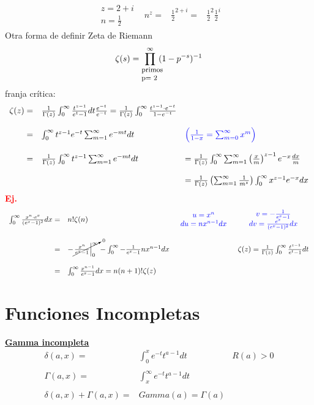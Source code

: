 \documentclass{article}
\theoremstyle{definition}
\begin{document}
\[
\begin{array}{lccc}
	\begin{array}{ll}
		z=2+i\\
		n=\frac{1}{2}
	\end{array} & n^z=&\frac{1}{2}^{2+i}=& \frac{1}{2}^2\frac{1}{2}^i
\end{array}
\]
Otra forma de definir Zeta de Riemann
\[\zeta (s)=\prod^{\infty}_{\parbox{2em}{\footnotesize primos p= 2}}(1-p^{-s})^{-1}\]
franja crítica:
\[
\begin{array}{rll}
	\zeta (z)=& \frac{1}{\Gamma (z)}\int^{\infty}_0\frac{t^{z-1}}{e^t-1}dt\frac{e^{-t}}{e^{-t}}=\frac{1}{\Gamma (z)}\int^{\infty}_0\frac{t^{z-1}\cdot e^{-t}}{1-e^{-t}}\\
	\\
	=& \int^{\infty}_0 t^{z-1}e^{-t}\sum^{\infty}_{m=1}e^{-mt}dt & \textcolor{blue}{\left(\frac{1}{1-x}=\sum^{\infty}_{m=0}x^m\right)}\\
	\\
	=& \frac{1}{\Gamma (z)} \int^{\infty}_0 t^{z-1} \sum^{\infty}_{m=1} e^{-mt}dt &=\frac{1}{\Gamma (z)}\int^{\infty}_0\sum^{\infty}_{m=1}\left(\frac{x}{m}\right)^{z-1}e^{-x}\frac{dx}{m}\\ 
	\\
	&&=\frac{1}{\Gamma (z)}\left(\sum^{\infty}_{m=1} \frac{1}{m^z}\right)\int^{\infty}_0x^{z-1}e^{-x}dx
\end{array}
\]
\textbf{\textcolor{red}{Ej.}}
\[
\begin{array}{rlcc}
	\int^{\infty}_0 \frac{x^n\cdot e^x}{(e^x-1)^2}dx=&n!\zeta (n) &\textcolor{blue}{\begin{array}{cc}
		u=x^n\\
		du=nx^{n-1}dx
	\end{array}}	& \textcolor{blue}{\begin{array}{cc}
		v=-\frac{1}{e^x-1}\\
		dv=\frac{e^x}{(e^x-1)^2}dx
	\end{array}}\\
	\\
	=&-\cancelto{0}{\left.\frac{x^n}{e^x-1}\right|^{\infty}_0}-\int^{\infty}_0-\frac{1}{e^x-1}nx^{n-1}dx&& \zeta (z)=\frac{1}{\Gamma (z)}\int^{\infty}_0 \frac{t^{z-1}}{e^t-1}dt\\
	\\
	=&\int^{\infty}_0 \frac{x^{n-1}}{e^x-1}dx=n(n+1)!\zeta (z)
\end{array}
\]
\section*{Funciones Incompletas}
\textbf{\underline{Gamma incompleta}}
\[
\begin{array}{rlr}
	\delta (a,x)=& \int^x_0e^{-t}t^{a-1}dt& R(a)>0\\
	\\
	\Gamma (a,x)=&\int^{\infty}_x e^{-t}t^{a-1}dt\\
	\\
	\delta (a,x)+ \Gamma (a,x)=& Gamma(a)=\Gamma (a)
\end{array}
\]
\end{document}
